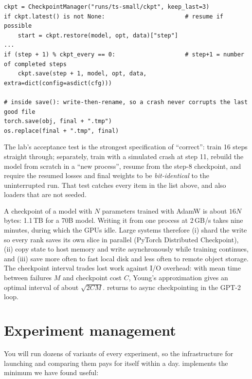 \begin{lstlisting}[caption={Saving and restoring with \texttt{CheckpointManager}.},label={lst:optim:ckptcode}]
ckpt = CheckpointManager("runs/ts-small/ckpt", keep_last=3)
if ckpt.latest() is not None:                       # resume if possible
    start = ckpt.restore(model, opt, data)["step"]
...
if (step + 1) % ckpt_every == 0:                    # step+1 = number of completed steps
    ckpt.save(step + 1, model, opt, data, extra=dict(config=asdict(cfg)))

# inside save(): write-then-rename, so a crash never corrupts the last good file
torch.save(obj, final + ".tmp")
os.replace(final + ".tmp", final)
\end{lstlisting}

The lab's acceptance test is the strongest specification of ``correct'': train 16 steps
straight through; separately, train with a simulated crash at step 11, rebuild the model from
scratch in a ``new process'', resume from the step-8 checkpoint, and require the resumed
losses and final weights to be \emph{bit-identical} to the uninterrupted run. That test catches
every item in the list above, and also loaders that are not seeded.

\begin{systemslens}
A checkpoint of a model with $N$ parameters trained with AdamW is about $16N$ bytes: 1.1\,TB
for a 70B model. Writing it from one process at 2\,GB/s takes nine minutes, during which the
GPUs idle. Large systems therefore (i) shard the write so every rank saves its own slice in parallel
(PyTorch Distributed Checkpoint), (ii) copy state to host memory and write asynchronously
while training continues, and (iii) save more often to fast local disk and less often to remote
object storage. The checkpoint interval trades lost work against I/O overhead: with mean time
between failures $M$ and checkpoint cost $C$, Young's approximation gives an optimal interval of
about $\sqrt{2CM}$.  returns to async checkpointing in the GPT-2 loop.
\end{systemslens}

\section{Experiment management}\label{sec:optim:explog}

You will run dozens of variants of every experiment, so the infrastructure for launching and comparing
them pays for itself within a day.  implements the minimum we have found
useful:

